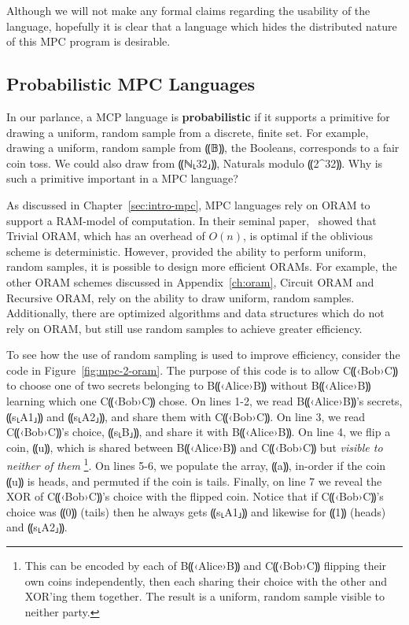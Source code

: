 \documentclass{report}
\newcommand{\alice}{B⸨‹Alice›B⸩\xspace}
\newcommand{\bob}{C⸨‹Bob›C⸩\xspace}
\begin{document}
Although we will not make any formal claims regarding the usability of the language, hopefully it is clear that a language which hides the
distributed nature of this MPC program is desirable.

\subsection{Probabilistic MPC Languages}

In our parlance, a MCP language is \textbf{probabilistic} if it supports a primitive for drawing a uniform, random sample from a
discrete, finite set. For example, drawing a uniform, random sample from ⸨𝔹⸩, the Booleans, corresponds to a fair coin toss. We
could also draw from ⸨ℕ⸤32⸥⸩, Naturals modulo ⸨2^{32}⸩. Why is such a primitive important in a MPC language?

As discussed in Chapter~\ref{sec:intro-mpc}, MPC languages rely on ORAM to support a RAM-model of computation. In their seminal paper,~\citet{}
showed that Trivial ORAM, which has an overhead of $O(n)$, is optimal if the oblivious scheme is deterministic. However, provided the ability
to perform uniform, random samples, it is possible to design more efficient ORAMs. For example, the other ORAM schemes discussed in
Appendix~\ref{ch:oram}, Circuit ORAM and Recursive ORAM, rely on the ability to draw uniform, random samples. Additionally, there are
optimized algorithms and data structures which do not rely on ORAM, but still use random samples to achieve greater efficiency.

To see how the use of random sampling is used to improve efficiency, consider the code in Figure~\ref{fig:mpc-2-oram}. The purpose of
this code is to allow \bob to choose one of two secrets belonging to \alice without \alice learning which one \bob chose. On lines 1-2,
we read \alice's secrets, ⸨s⸤A1⸥⸩ and ⸨s⸤A2⸥⸩, and share them with \bob. On line 3, we read \bob's choice, ⸨s⸤B⸥⸩, and share it with \alice.
On line 4, we flip a coin, ⸨u⸩, which is shared between \alice and \bob but \emph{visible to neither of them}
\footnote{This can be encoded by each of \alice and \bob flipping their own coins independently, then each sharing their choice with the other
  and XOR'ing them together. The result is a uniform, random sample visible to neither party.}. On lines 5-6, we populate the array, ⸨a⸩,
in-order if the coin ⸨u⸩ is heads, and permuted if the coin is tails. Finally, on line 7 we reveal the XOR of \bob's choice with the flipped
coin. Notice that if \bob's choice was ⸨0⸩ (tails) then he always gets ⸨s⸤A1⸥⸩ and likewise for ⸨1⸩ (heads) and ⸨s⸤A2⸥⸩.
\end{document}

